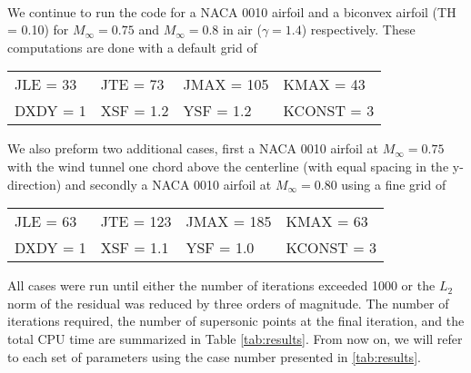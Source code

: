 \vspace{1cm}


\\

We continue to run the code for a NACA 0010 airfoil and a biconvex airfoil (TH = 0.10) for $M_\infty = 0.75$ and $M_\infty = 0.8$ in air ($\gamma = 1.4$) respectively. These computations are done with a default grid of

\begin{center}
    \begin{tabular}{@{} l l l l @{}}
        JLE = 33  & JTE = 73  & JMAX = 105  & KMAX = 43 \\
        DXDY = 1  & XSF = 1.2  & YSF = 1.2  & KCONST = 3
    \end{tabular}    
\end{center}


We also preform two additional cases, first a NACA 0010 airfoil at $M_\infty = 0.75$ with the wind tunnel one chord above the centerline (with equal spacing in the y-direction) and secondly a NACA 0010 airfoil at $M_\infty = 0.80$ using a fine grid of

\begin{center}
    \begin{tabular}{@{} l l l l @{}}
        JLE = 63  & JTE = 123  & JMAX = 185  & KMAX = 63 \\
        DXDY = 1  & XSF = 1.1  & YSF = 1.0  & KCONST = 3
    \end{tabular}    
\end{center}

All cases were run until either the number of iterations exceeded 1000 or the $L_2$ norm of the residual was reduced by three orders of magnitude. The number of iterations required, the number of supersonic points at the final iteration, and the total CPU time are summarized in Table \ref{tab:results}. From now on, we will refer to each set of parameters using the case number presented in \ref{tab:results}.

